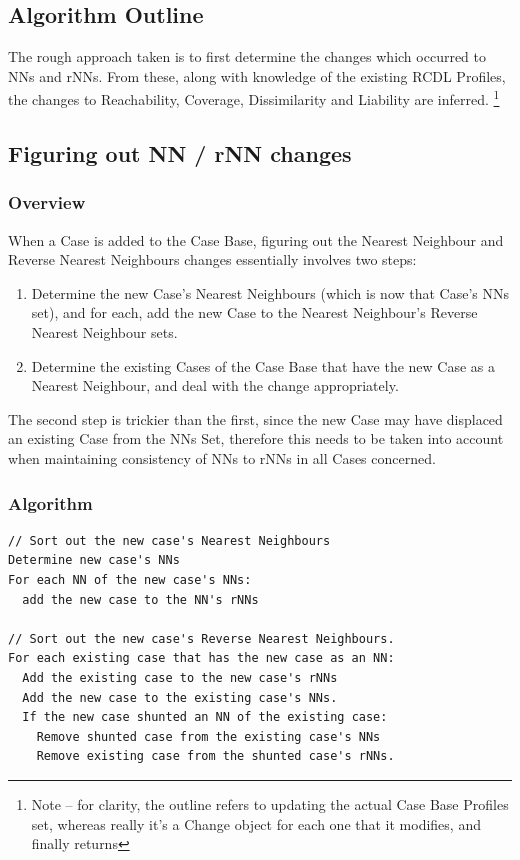 \documentclass[a4paper,11pt]{report}
\begin{document}
\subsection{Algorithm Outline}
The rough approach taken is to first determine the changes which occurred to NNs and rNNs. From these, along with knowledge of the existing RCDL Profiles, the changes to Reachability, Coverage, Dissimilarity and Liability are inferred. \footnote{Note – for clarity, the outline refers to updating the actual Case Base Profiles set, whereas really it's a Change object for each one that it modifies, and finally returns}

\subsection{Figuring out NN / rNN changes}
\subsubsection{Overview}
When a Case is added to the Case Base, figuring out the Nearest Neighbour and Reverse Nearest Neighbours changes essentially involves two steps:
\begin{enumerate}
	\item Determine the new Case's Nearest Neighbours (which is now that Case's NNs set), and for each, add the new Case to the Nearest Neighbour's Reverse Nearest Neighbour sets.
	\item Determine the existing Cases of the Case Base that have the new Case as a Nearest Neighbour, and deal with the change appropriately.
\end{enumerate}

The second step is trickier than the first, since the new Case may have displaced an existing Case from the NNs Set, therefore this needs to be taken into account when maintaining consistency of NNs to rNNs in all Cases concerned.

\begin{samepage}
\subsubsection{Algorithm}

{\small 
\begin{verbatim}
// Sort out the new case's Nearest Neighbours
Determine new case's NNs
For each NN of the new case's NNs:
  add the new case to the NN's rNNs

// Sort out the new case's Reverse Nearest Neighbours.
For each existing case that has the new case as an NN:
  Add the existing case to the new case's rNNs
  Add the new case to the existing case's NNs.
  If the new case shunted an NN of the existing case:
    Remove shunted case from the existing case's NNs
    Remove existing case from the shunted case's rNNs.
\end{verbatim}
}
\end{samepage}
\end{document}
